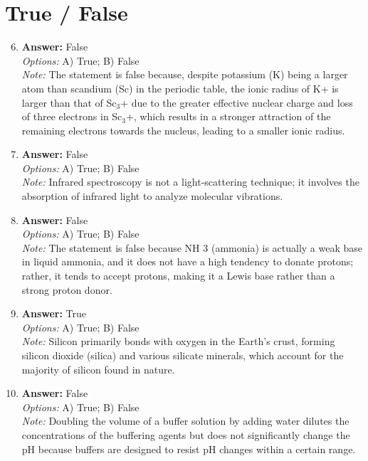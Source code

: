 \documentclass[12pt]{article}
\begin{document}
\section*{True / False}
\begin{enumerate}[label=\arabic*.]
\setcounter{enumi}{5}
\item \textbf{Answer:} False
\\ \textit{Options:} A) True; B) False
\\ \textit{Note:} The statement is false because, despite potassium (K) being a larger atom than scandium (Sc) in the periodic table, the ionic radius of K+ is larger than that of Sc$_{3}$+ due to the greater effective nuclear charge and loss of three electrons in Sc$_{3}$+, which results in a stronger attraction of the remaining electrons towards the nucleus, leading to a smaller ionic radius.
\item \textbf{Answer:} False
\\ \textit{Options:} A) True; B) False
\\ \textit{Note:} Infrared spectroscopy is not a light-scattering technique; it involves the absorption of infrared light to analyze molecular vibrations.
\item \textbf{Answer:} False
\\ \textit{Options:} A) True; B) False
\\ \textit{Note:} The statement is false because NH 3 (ammonia) is actually a weak base in liquid ammonia, and it does not have a high tendency to donate protons; rather, it tends to accept protons, making it a Lewis base rather than a strong proton donor.
\item \textbf{Answer:} True
\\ \textit{Options:} A) True; B) False
\\ \textit{Note:} Silicon primarily bonds with oxygen in the Earth's crust, forming silicon dioxide (silica) and various silicate minerals, which account for the majority of silicon found in nature.
\item \textbf{Answer:} False
\\ \textit{Options:} A) True; B) False
\\ \textit{Note:} Doubling the volume of a buffer solution by adding water dilutes the concentrations of the buffering agents but does not significantly change the pH because buffers are designed to resist pH changes within a certain range.
\end{enumerate}
\end{document}
